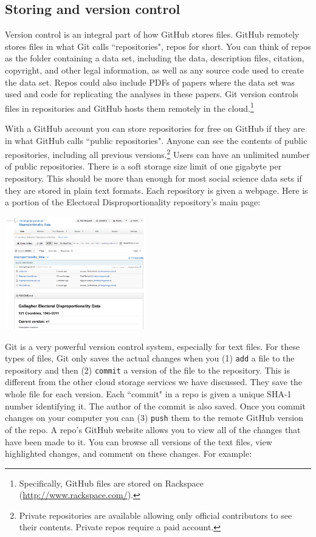 \documentclass[twocolumn]{article}\usepackage{graphicx, color}
\begin{document}
\subsection{Storing and version control}

Version control is an integral part of how GitHub stores files. GitHub remotely stores files in what Git calls ``repositories", repos for short. You can think of repos as the folder containing a data set, including the data, description files, citation, copyright, and other legal information, as well as any source code used to create the data set. Repos could also include PDFs of papers where the data set was used and code for replicating the analyses in these papers. Git version controls files in repositories and GitHub hosts them remotely in the cloud.\footnote{Specifically, GitHub files are stored on Rackspace (\url{http://www.rackspace.com/}).} 

With a GitHub account you can store repositories for free on GitHub if they are in what GitHub calls ``public repositories". Anyone can see the contents of public repositories, including all previous versions.\footnote{Private repositories are available allowing only official contributors to see their contents. Private repos require a paid account.} Users can have an unlimited number of public repositories. There is a soft storage size limit of one gigabyte per repository. This should be more than enough for most social science data sets if they are stored in plain text formats. Each repository is given a webpage. Here is a portion of the Electoral Disproportionality repository's main page:

\begin{center}
	\includegraphics[width=0.46\textwidth]{images/MainPage.png}
\end{center}

Git is a very powerful version control system, especially for text files. For these types of files, Git only saves the actual changes when you (1) \texttt{add} a file to the repository and then (2) \texttt{commit} a version of the file to the repository. This is different from the other cloud storage services we have discussed. They save the whole file for each version. Each ``commit" in a repo is given a unique SHA-1 number identifying it. The author of the commit is also saved. Once you commit changes on your computer you can (3) \texttt{push} them to the remote GitHub version of the repo. A repo's GitHub website allows you to view all of the changes that have been made to it. You can browse all versions of the text files, view highlighted changes, and comment on these changes. For example:
\end{document}
